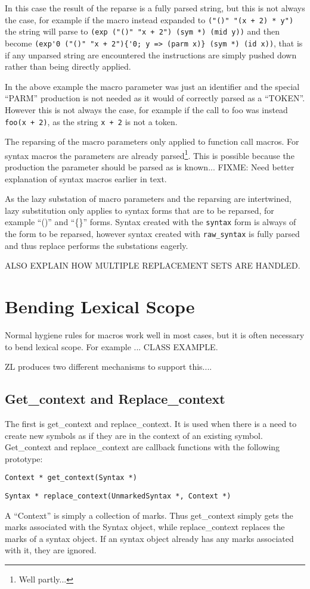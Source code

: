 \documentclass[12pt,english,letterpaper]{article}
\begin{document}
In this case the result of the reparse is a fully parsed string, but
this is not always the case, for example if the macro instead expanded
to \verb/("()" "(x + 2) * y")/ the string will parse to
\verb/(exp ("()" "x + 2") (sym *) (mid y))/ and then become
\verb/(exp'0 ("()" "x + 2"){'0; y => (parm x)} (sym *) (id x))/, that
is if any unparsed string are encountered the instructions are simply
pushed down rather than being directly applied.

In the above example the macro parameter was just an identifier and the
special ``PARM'' production is not needed as it would of correctly
parsed as a ``TOKEN''.  However this is not always the case, for
example if the call to foo was instead \verb/foo(x + 2)/, as the
string \verb/x + 2/ is not a token.

The reparsing of the macro parameters only applied to function call
macros.  For syntax macros the parameters are already
parsed\footnote{Well partly...}.  This is possible because the
production the parameter should be parsed as is known... FIXME: Need
better explanation of syntax macros earlier in text.

As the lazy substation of macro parameters and the reparsing are
intertwined, lazy substitution only applies to syntax forms that are to
be reparsed, for example ``()'' and ``\{\}'' forms.  Syntax created
with the \verb/syntax/ form is always of the form to be reparsed,
however syntax created with \verb/raw_syntax/ is fully parsed and thus
replace performs the substations eagerly.

ALSO EXPLAIN HOW MULTIPLE REPLACEMENT SETS ARE HANDLED.

\section{Bending Lexical Scope}

Normal hygiene rules for macros work well in most cases, but it is
often necessary to bend lexical scope.  For example ... CLASS EXAMPLE.

ZL produces two different mechanisms to support this....

\subsection{Get\_context and Replace\_context}
\label{replace_context}

The first is get\_context and replace\_context.  It is used when there
is a need to create new symbols as if they are in the context of an
existing symbol.  Get\_context and replace\_context are callback
functions with the following prototype:
\begin{itemize*}
\item \verb/Context * get_context(Syntax *)/
\item \verb/Syntax * replace_context(UnmarkedSyntax *, Context *)/
\end{itemize*}
A ``Context'' is simply a collection of marks.  Thus get\_context
simply gets the marks associated with the Syntax object, while
replace\_context replaces the marks of a syntax object.  If an syntax
object already has any marks associated with it, they are ignored.
\end{document}
